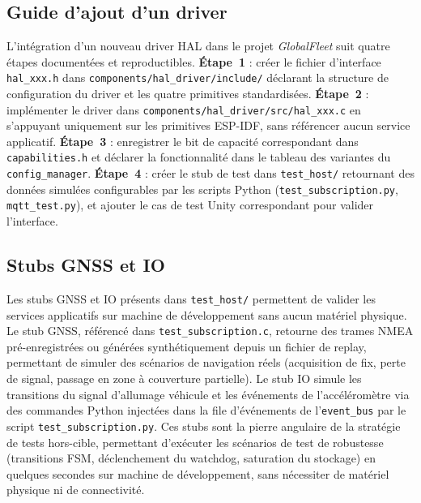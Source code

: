 \subsection{Guide d'ajout d'un driver}
\label{subsec:hal_guide}

L'intégration d'un nouveau driver HAL dans le projet \textit{GlobalFleet}
suit quatre étapes documentées et reproductibles. \textbf{Étape~1} :
créer le fichier d'interface \texttt{hal\_xxx.h} dans
\texttt{components/hal\_driver/include/} déclarant la structure de
configuration du driver et les quatre primitives standardisées.
\textbf{Étape~2} : implémenter le driver dans
\texttt{components/hal\_driver/src/hal\_xxx.c} en s'appuyant
uniquement sur les primitives ESP-IDF, sans référencer aucun service
applicatif. \textbf{Étape~3} : enregistrer le bit de capacité
correspondant dans \texttt{capabilities.h} et déclarer la fonctionnalité
dans le tableau des variantes du \texttt{config\_manager}. \textbf{Étape~4} :
créer le stub de test dans \texttt{test\_host/} retournant des données
simulées configurables par les scripts Python
(\texttt{test\_subscription.py}, \texttt{mqtt\_test.py}), et ajouter
le cas de test Unity correspondant pour valider l'interface.

\subsection{Stubs GNSS et IO}
\label{subsec:hal_stubs_impl}

Les stubs GNSS et IO présents dans \texttt{test\_host/} permettent
de valider les services applicatifs sur machine de développement sans
aucun matériel physique. Le stub GNSS, référencé dans
\texttt{test\_subscription.c}, retourne des trames NMEA
pré-enregistrées ou générées synthétiquement depuis un fichier de
replay, permettant de simuler des scénarios de navigation réels
(acquisition de fix, perte de signal, passage en zone à couverture
partielle). Le stub IO simule les transitions du signal d'allumage
véhicule et les événements de l'accéléromètre via des commandes Python
injectées dans la file d'événements de l'\texttt{event\_bus} par le
script \texttt{test\_subscription.py}. Ces stubs sont la pierre
angulaire de la stratégie de tests hors-cible, permettant d'exécuter
les scénarios de test de robustesse (transitions FSM, déclenchement
du watchdog, saturation du stockage) en quelques secondes sur machine
de développement, sans nécessiter de matériel physique ni de
connectivité.

